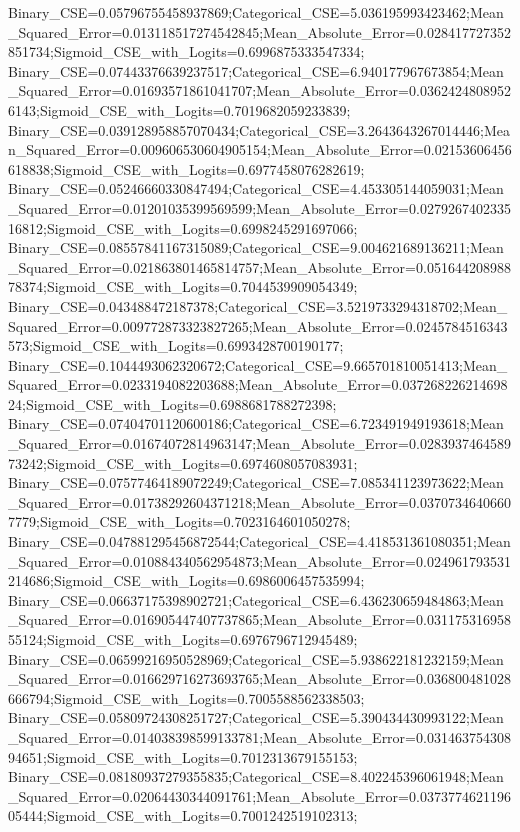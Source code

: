 Binary_CSE=0.05796755458937869;Categorical_CSE=5.036195993423462;Mean_Squared_Error=0.013118517274542845;Mean_Absolute_Error=0.028417727352851734;Sigmoid_CSE_with_Logits=0.6996875333547334;
Binary_CSE=0.07443376639237517;Categorical_CSE=6.940177967673854;Mean_Squared_Error=0.01693571861041707;Mean_Absolute_Error=0.03624248089526143;Sigmoid_CSE_with_Logits=0.7019682059233839;
Binary_CSE=0.039128958857070434;Categorical_CSE=3.2643643267014446;Mean_Squared_Error=0.009606530604905154;Mean_Absolute_Error=0.02153606456618838;Sigmoid_CSE_with_Logits=0.6977458076282619;
Binary_CSE=0.05246660330847494;Categorical_CSE=4.453305144059031;Mean_Squared_Error=0.01201035399569599;Mean_Absolute_Error=0.027926740233516812;Sigmoid_CSE_with_Logits=0.6998245291697066;
Binary_CSE=0.08557841167315089;Categorical_CSE=9.004621689136211;Mean_Squared_Error=0.021863801465814757;Mean_Absolute_Error=0.05164420898878374;Sigmoid_CSE_with_Logits=0.7044539909054349;
Binary_CSE=0.043488472187378;Categorical_CSE=3.5219733294318702;Mean_Squared_Error=0.009772873323827265;Mean_Absolute_Error=0.0245784516343573;Sigmoid_CSE_with_Logits=0.6993428700190177;
Binary_CSE=0.1044493062320672;Categorical_CSE=9.665701810051413;Mean_Squared_Error=0.0233194082203688;Mean_Absolute_Error=0.03726822621469824;Sigmoid_CSE_with_Logits=0.6988681788272398;
Binary_CSE=0.07404701120600186;Categorical_CSE=6.723491949193618;Mean_Squared_Error=0.01674072814963147;Mean_Absolute_Error=0.028393746458973242;Sigmoid_CSE_with_Logits=0.6974608057083931;
Binary_CSE=0.07577464189072249;Categorical_CSE=7.085341123973622;Mean_Squared_Error=0.01738292604371218;Mean_Absolute_Error=0.03707346406607779;Sigmoid_CSE_with_Logits=0.7023164601050278;
Binary_CSE=0.047881295456872544;Categorical_CSE=4.418531361080351;Mean_Squared_Error=0.010884340562954873;Mean_Absolute_Error=0.024961793531214686;Sigmoid_CSE_with_Logits=0.6986006457535994;
Binary_CSE=0.06637175398902721;Categorical_CSE=6.436230659484863;Mean_Squared_Error=0.016905447407737865;Mean_Absolute_Error=0.03117531695855124;Sigmoid_CSE_with_Logits=0.6976796712945489;
Binary_CSE=0.06599216950528969;Categorical_CSE=5.938622181232159;Mean_Squared_Error=0.016629716273693765;Mean_Absolute_Error=0.036800481028666794;Sigmoid_CSE_with_Logits=0.7005588562338503;
Binary_CSE=0.05809724308251727;Categorical_CSE=5.390434430993122;Mean_Squared_Error=0.014038398599133781;Mean_Absolute_Error=0.03146375430894651;Sigmoid_CSE_with_Logits=0.7012313679155153;
Binary_CSE=0.08180937279355835;Categorical_CSE=8.402245396061948;Mean_Squared_Error=0.02064430344091761;Mean_Absolute_Error=0.037377462119605444;Sigmoid_CSE_with_Logits=0.7001242519102313;
